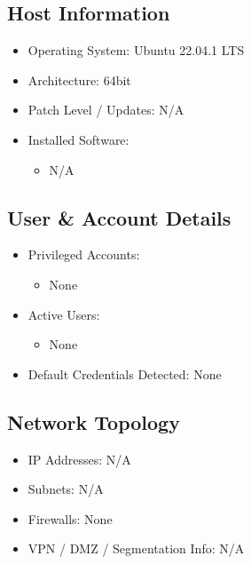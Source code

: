 \documentclass[a4paper,12pt]{article}
\begin{document}
\subsection*{Host Information}
\begin{itemize}
    \item Operating System: Ubuntu 22.04.1 LTS
    \item Architecture: 64bit
    \item Patch Level / Updates: N/A
    \item Installed Software: 
    \begin{itemize}
    
        \item N/A
    
    \end{itemize}
\end{itemize}

\subsection*{User \& Account Details}
\begin{itemize}
    \item Privileged Accounts: 
    \begin{itemize}
    
        \item None
    
    \end{itemize}
    \item Active Users:
    \begin{itemize}
    
        \item None
    
    \end{itemize}
    \item Default Credentials Detected: None
\end{itemize}

\subsection*{Network Topology}
\begin{itemize}
    \item IP Addresses: N/A
    \item Subnets: N/A
    \item Firewalls: None
    \item VPN / DMZ / Segmentation Info: N/A
\end{itemize}
\end{document}
